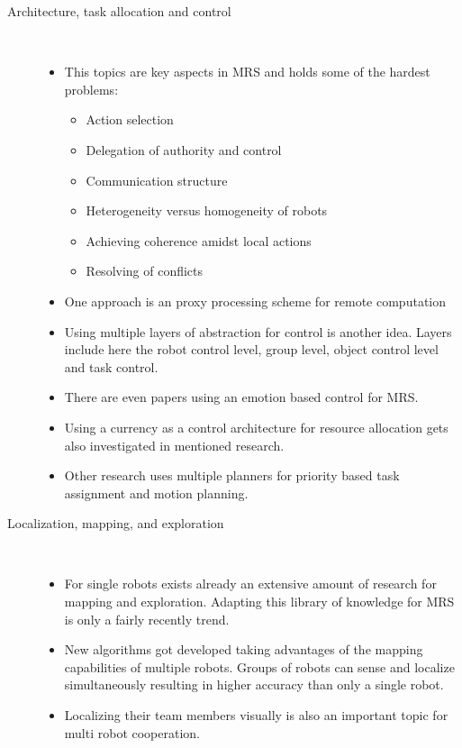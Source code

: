 \begin{itemize}
\begin{description}
            \item[Architecture, task allocation and control] \ 
            \begin{itemize} 
                \item This topics are key aspects in MRS and holds some of the hardest problems: \
                \begin{itemize}
                    \item Action selection
                    \item Delegation of authority and control
                    \item Communication structure
                    \item Heterogeneity versus homogeneity of robots
                    \item Achieving coherence amidst local actions
                    \item Resolving of conflicts
                \end{itemize}
                \item One approach is an proxy processing scheme for remote computation
                \item Using multiple layers of abstraction for control is another idea. Layers include here the robot control level, group level, object control level and task control.
                \item There are even papers using an emotion based control for MRS.
                \item Using a currency as a control architecture for resource allocation gets also investigated in mentioned research.
                \item Other research uses multiple planners for priority based task assignment and motion planning.
            \end{itemize}
            \item[Localization, mapping, and exploration] \ 
            \begin{itemize} 
                \item For single robots exists already an extensive amount of research for mapping and exploration. Adapting this library of knowledge for MRS is only a fairly recently trend.
                \item New algorithms got developed taking advantages of the mapping capabilities of multiple robots. Groups of robots can sense and localize simultaneously resulting in higher accuracy than only a single robot.
                \item Localizing their team members visually is also an important topic for multi robot cooperation.

\end{itemize}
\end{description}
\end{itemize}
